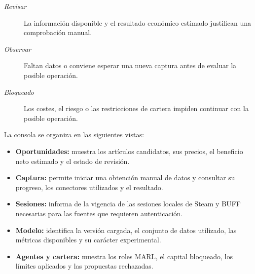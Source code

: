 \begin{description}
    \item[\emph{Revisar}] La información disponible y el resultado económico estimado justifican una comprobación manual.
    \item[\emph{Observar}] Faltan datos o conviene esperar una nueva captura antes de evaluar la posible operación.
    \item[\emph{Bloqueado}] Los costes, el riesgo o las restricciones de cartera impiden continuar con la posible operación.
\end{description}

La consola se organiza en las siguientes vistas:
\begin{itemize}
  \item \textbf{Oportunidades:} muestra los artículos candidatos, sus precios, el beneficio neto estimado y el estado de revisión.
  \item \textbf{Captura:} permite iniciar una obtención manual de datos y consultar su progreso, los conectores utilizados y el resultado.
  \item \textbf{Sesiones:} informa de la vigencia de las sesiones locales de Steam y BUFF necesarias para las fuentes que requieren autenticación.
  \item \textbf{Modelo:} identifica la versión cargada, el conjunto de datos utilizado, las métricas disponibles y su carácter experimental.
  \item \textbf{Agentes y cartera:} muestra los roles MARL, el capital bloqueado, los límites aplicados y las propuestas rechazadas.
\end{itemize}
